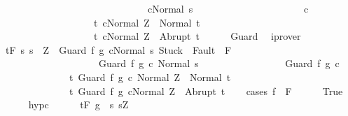 \begin{isabellebody}
\ \ \ \ \ \ \ \ \ \ \ \ \ \ \ \ \ \ \ \ \ \ \ \ \ \ \ \ \ \ {\isasymGamma}{\isasymturnstile}c{\isasymdown}Normal\ s{\isacharbraceright}\ \isanewline
\ \ \ \ \ \ \ \ \ \ \ \ \ \ \ \ \ \ \ \ \ c\ \isanewline
\ \ \ \ \ \ \ \ \ \ \ \ \ \ \ \ \ \ \ {\isacharbraceleft}t{\isachardot}\ {\isasymGamma}{\isasymturnstile}{\isasymlangle}c{\isacharcomma}Normal\ Z{\isasymrangle}\ {\isasymRightarrow}\ Normal\ t{\isacharbraceright}{\isacharcomma}\isanewline
\ \ \ \ \ \ \ \ \ \ \ \ \ \ \ \ \ \ \ {\isacharbraceleft}t{\isachardot}\ {\isasymGamma}{\isasymturnstile}{\isasymlangle}c{\isacharcomma}Normal\ Z{\isasymrangle}\ {\isasymRightarrow}\ Abrupt\ t{\isacharbraceright}{\isachardoublequoteclose}\isanewline
\ \ \ \ \isamarkupfalse%
\ Guard\ \isamarkupfalse%
\ iprover\isanewline
\ \ \isamarkupfalse%
\ {\isachardoublequoteopen}{\isasymGamma}{\isacharcomma}{\isasymTheta}{\isasymturnstile}\isactrlsub t\isactrlbsub {\isacharslash}F\isactrlesub \ {\isacharbraceleft}s{\isachardot}\ s\ {\isacharequal}\ Z\ {\isasymand}\ {\isasymGamma}{\isasymturnstile}{\isasymlangle}Guard\ f\ g\ c{\isacharcomma}Normal\ s{\isasymrangle}\ {\isasymRightarrow}{\isasymnotin}{\isacharparenleft}{\isacharbraceleft}Stuck{\isacharbraceright}\ {\isasymunion}\ Fault\ {\isacharbackquote}\ {\isacharparenleft}{\isacharminus}F{\isacharparenright}{\isacharparenright}\ {\isasymand}\ \isanewline
\ \ \ \ \ \ \ \ \ \ \ \ \ \ \ \ \ \ \ \ {\isasymGamma}{\isasymturnstile}Guard\ f\ g\ c{\isasymdown}\ Normal\ s{\isacharbraceright}\ \isanewline
\ \ \ \ \ \ \ \ \ \ \ \ \ \ \ \ Guard\ f\ g\ c\ \isanewline
\ \ \ \ \ \ \ \ \ \ \ \ \ \ {\isacharbraceleft}t{\isachardot}\ {\isasymGamma}{\isasymturnstile}{\isasymlangle}Guard\ f\ g\ c\ {\isacharcomma}Normal\ Z{\isasymrangle}\ {\isasymRightarrow}\ Normal\ t{\isacharbraceright}{\isacharcomma}\isanewline
\ \ \ \ \ \ \ \ \ \ \ \ \ \ {\isacharbraceleft}t{\isachardot}\ {\isasymGamma}{\isasymturnstile}{\isasymlangle}Guard\ f\ g\ c{\isacharcomma}Normal\ Z{\isasymrangle}\ {\isasymRightarrow}\ Abrupt\ t{\isacharbraceright}{\isachardoublequoteclose}\isanewline
\ \ \isamarkupfalse%
\ {\isacharparenleft}cases\ {\isachardoublequoteopen}f\ {\isasymin}\ F{\isachardoublequoteclose}{\isacharparenright}\isanewline
\ \ \ \ \isamarkupfalse%
\ True\isanewline
\ \ \ \ \isamarkupfalse%
\ hyp{\isacharunderscore}c\isanewline
\ \ \ \ \isamarkupfalse%
\ {\isachardoublequoteopen}{\isasymGamma}{\isacharcomma}{\isasymTheta}{\isasymturnstile}\isactrlsub t\isactrlbsub {\isacharslash}F\ \isactrlesub {\isacharparenleft}g\ {\isasyminter}\ {\isacharbraceleft}s{\isachardot}\ s{\isacharequal}Z\ {\isasymand}\ \isanewline

\end{isabellebody}
